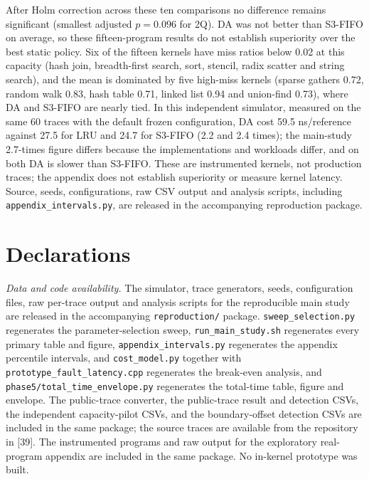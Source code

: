 \documentclass[10pt,twocolumn,a4paper]{IEEEtran}
\begin{document}
After Holm correction across these ten comparisons no difference remains
significant (smallest adjusted $p=0.096$ for 2Q). DA was not better than
S3-FIFO on average, so these fifteen-program results do not establish
superiority over the best static policy. Six of the fifteen kernels have miss ratios below 0.02 at this
capacity (hash join, breadth-first search, sort, stencil, radix scatter and
string search), and the mean is dominated by five high-miss kernels (sparse
gathers 0.72, random walk 0.83, hash table 0.71, linked list 0.94 and
union-find 0.73), where DA and S3-FIFO are nearly tied. In this independent
simulator, measured on the same 60 traces with the default frozen
configuration, DA cost 59.5 ns/reference against 27.5 for LRU and 24.7 for
S3-FIFO (2.2 and 2.4 times); the main-study 2.7-times figure differs because
the implementations and workloads differ, and on both DA is slower than
S3-FIFO. These are instrumented kernels, not production traces; the appendix
does not establish superiority or measure kernel latency. Source, seeds,
configurations, raw CSV output and analysis scripts, including
\texttt{appendix\_intervals.py}, are released in the accompanying reproduction
package.

\section*{Declarations}

\emph{Data and code availability.} The simulator, trace generators, seeds,
configuration files, raw per-trace output and analysis scripts for the
reproducible main study are released in the accompanying
\texttt{reproduction/} package. \texttt{sweep\_selection.py} regenerates the
parameter-selection sweep, \texttt{run\_main\_study.sh} regenerates every
primary table and figure, \texttt{appendix\_intervals.py} regenerates the
appendix percentile intervals, and \texttt{cost\_model.py} together with
\texttt{prototype\_fault\_latency.cpp} regenerates the break-even analysis, and
\texttt{phase5/total\_time\_envelope.py} regenerates the total-time table,
figure and envelope.
The public-trace converter, the public-trace result and detection CSVs, the
independent capacity-pilot CSVs, and the boundary-offset detection CSVs are included in the
same package; the source traces are available from the repository in [39].
The instrumented programs and raw output for the exploratory real-program
appendix are included in the same package. No in-kernel prototype was built.
\end{document}
